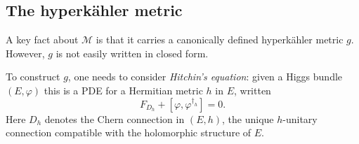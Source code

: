 \documentclass[12pt,letterpaper,reqno]{article}
\numberwithin{equation}{section}
\newcommand{\cB}{\ensuremath{\mathcal B}}
\newcommand{\cM}{\ensuremath{\mathcal M}}
\newcommand{\R}{\ensuremath{\mathbb R}}
\newcommand{\bbC}{\ensuremath{\mathbb C}}
\newcommand{\bbP}{\ensuremath{\mathbb P}}
\newcommand{\hk}{hyperk\"ahler\xspace}
\newcommand{\sing}{\mathrm{sing}}
\newcommand{\abs}[1]{\lvert#1\rvert}
\newcommand{\vphi}{{\vec\phi}}
\newcommand{\ti}[1]{\textit{#1}}
\newcommand{\SU}{\mathrm{SU}}
\newcommand{\insfig}[2]{

\medskip
\noindent
\begin{minipage}{\linewidth}

\makebox[\linewidth]{\texttt{[image: figures/\#1-crop.pdf]}}

\end{minipage}
\medskip

}
\newcommand{\fixme}[1]{{\color{orange}{[#1]}}}
\begin{document}







\subsection{The \hk metric}

A key fact about $\cM$ is that it carries a canonically
defined \hk metric $g$. However, $g$ is not easily
written in closed form.

To construct $g$, one needs to consider \ti{Hitchin's equation}:
given a Higgs bundle $(E,\varphi)$ this is a PDE
for a Hermitian metric $h$ in $E$, written
\begin{equation} \label{eq:hitchin-equation}
  F_{D_h} + [\varphi, \varphi^{\dagger_h}] = 0.
\end{equation}
Here $D_h$ denotes the Chern connection in $(E,h)$,
the unique $h$-unitary connection compatible with
the holomorphic structure of $E$.
\end{document}
